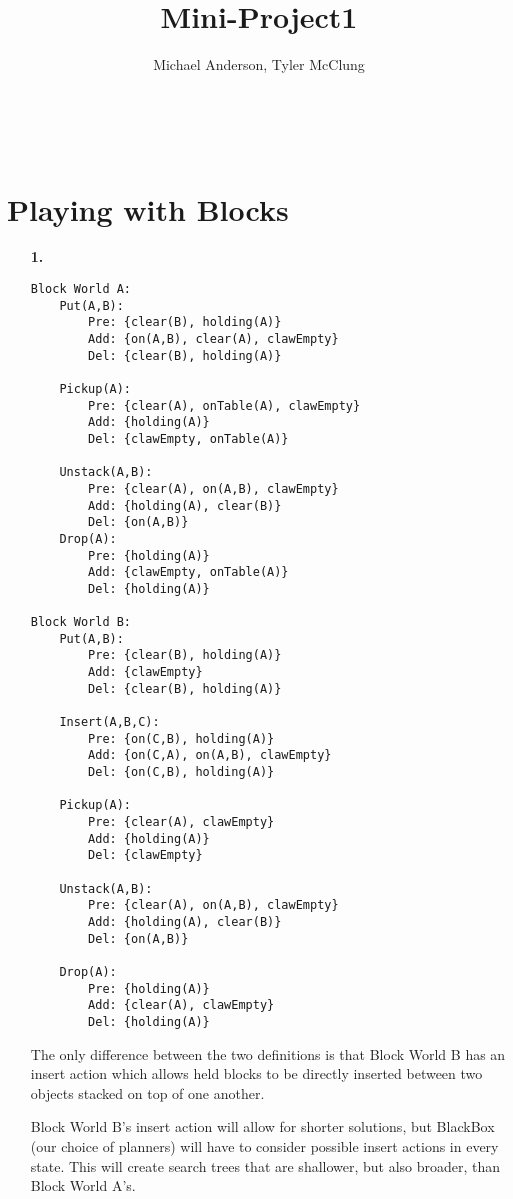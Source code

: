 \documentclass{article}
\author{Michael Anderson, Tyler McClung}
\title{Mini-Project1}
\begin{document}
\maketitle
{}
\\
\flushleft
\newpage

\section{Playing with Blocks}

\begin{enumerate}
\item[\textbf{1.}]

\begin{small}
\begin{verbatim}
Block World A:
    Put(A,B):
        Pre: {clear(B), holding(A)}
        Add: {on(A,B), clear(A), clawEmpty}
        Del: {clear(B), holding(A)}

    Pickup(A):
        Pre: {clear(A), onTable(A), clawEmpty}
        Add: {holding(A)}
        Del: {clawEmpty, onTable(A)}

    Unstack(A,B):
        Pre: {clear(A), on(A,B), clawEmpty}
        Add: {holding(A), clear(B)}
        Del: {on(A,B)}
    Drop(A):
        Pre: {holding(A)}
        Add: {clawEmpty, onTable(A)}
        Del: {holding(A)}

Block World B:
    Put(A,B):
        Pre: {clear(B), holding(A)}
        Add: {clawEmpty}
        Del: {clear(B), holding(A)}

    Insert(A,B,C):
        Pre: {on(C,B), holding(A)}
        Add: {on(C,A), on(A,B), clawEmpty}
        Del: {on(C,B), holding(A)}

    Pickup(A):
        Pre: {clear(A), clawEmpty}
        Add: {holding(A)}
        Del: {clawEmpty}

    Unstack(A,B):
        Pre: {clear(A), on(A,B), clawEmpty}
        Add: {holding(A), clear(B)}
        Del: {on(A,B)}

    Drop(A):
        Pre: {holding(A)}
        Add: {clear(A), clawEmpty}
        Del: {holding(A)}
\end{verbatim}
\end{small}

The only difference between the two definitions is that Block World B
has an insert action which allows held blocks to be directly inserted
between two objects stacked on top of one another.

Block World B's insert action will allow for shorter solutions, but
BlackBox (our choice of planners) will have to consider possible
insert actions in every state. This will create search trees that are
shallower, but also broader, than Block World A's.


\end{enumerate}
\end{document}
